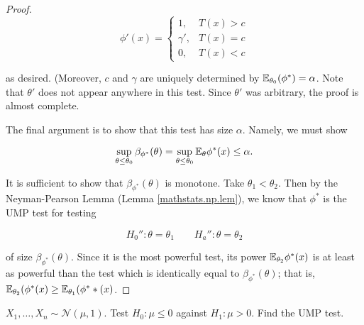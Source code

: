 \begin{proof}
\[
\phi'(x) = \begin{cases}
1, & T(x) > c \\
\gamma', & T(x) = c \\
0, & T(x) < c
\end{cases}
\]

as desired. (Moreover, \(c\) and \(\gamma\) are uniquely determined by \(\E_{\theta_0}(\phi^*) = \alpha\). Note that \(\theta'\) does not appear anywhere in this test. Since \(\theta'\) was arbitrary, the proof is almost complete.

The final argument is to show that this test has size \(\alpha\). Namely, we must show

\[
\sup_{\theta \leq \theta_0} \beta_{\phi^*}(\theta) = \sup_{\theta \leq \theta_0} \E_\theta \phi^*(x) \leq \alpha.
\]

It is sufficient to show that \(\beta_{\phi^*}(\theta)\) is monotone. Take \(\theta_1 < \theta_2\). Then by the Neyman-Pearson Lemma (Lemma \ref{mathstats.np.lem}), we know that \(\phi^*\) is the UMP test for testing

\[
H_0'':  \theta = \theta_1 \qquad H_a'':  \theta = \theta_2
\]

of size \(\beta_{\phi^*}(\theta)\). Since it is the most powerful test, its power \(\E_{\theta_2} \phi^*(x)\) is at least as powerful than the test which is identically equal to \(\beta_{\phi^*}(\theta)\); that is, \(\E_{\theta_2}(\phi^*(x) \geq \E_{\theta_1}(\phi^**(x)\).



\end{proof}


\begin{example}

\(X_1, \ldots, X_n \sim \mathcal{N}(\mu, 1)\). Test \(H_0: \mu \leq 0\) against \(H_1: \mu > 0\). Find the UMP test.

\end{example}

